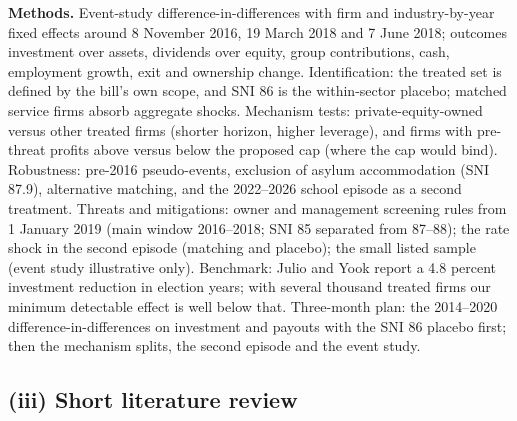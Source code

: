 \documentclass[12pt,a4paper]{article}
\begin{document}
\textbf{Methods.} Event-study difference-in-differences with firm and industry-by-year fixed effects around 8 November 2016, 19 March 2018 and 7 June 2018; outcomes investment over assets, dividends over equity, group contributions, cash, employment growth, exit and ownership change. Identification: the treated set is defined by the bill's own scope, and SNI 86 is the within-sector placebo; matched service firms absorb aggregate shocks. Mechanism tests: private-equity-owned versus other treated firms (shorter horizon, higher leverage), and firms with pre-threat profits above versus below the proposed cap (where the cap would bind). Robustness: pre-2016 pseudo-events, exclusion of asylum accommodation (SNI 87.9), alternative matching, and the 2022--2026 school episode as a second treatment. Threats and mitigations: owner and management screening rules from 1 January 2019 (main window 2016--2018; SNI 85 separated from 87--88); the rate shock in the second episode (matching and placebo); the small listed sample (event study illustrative only). Benchmark: Julio and Yook report a 4.8 percent investment reduction in election years; with several thousand treated firms our minimum detectable effect is well below that. Three-month plan: the 2014--2020 difference-in-differences on investment and payouts with the SNI 86 placebo first; then the mechanism splits, the second episode and the event study.

\subsection{(iii) Short literature review}
\end{document}
